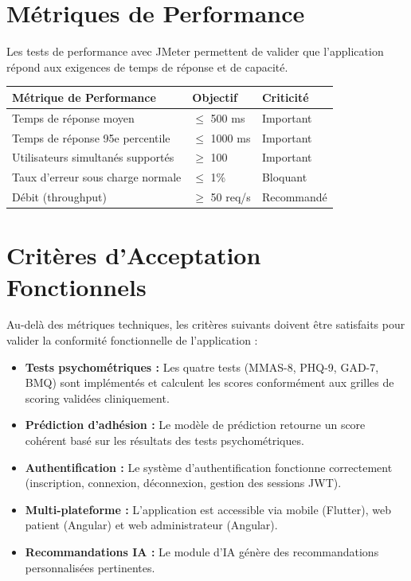 \documentclass[12pt,a4paper]{report}
\begin{document}
\section{Métriques de Performance}

Les tests de performance avec JMeter permettent de valider que l'application répond aux exigences de temps de réponse et de capacité.

\begin{center}
\begin{tabular}{|l|l|l|}
    \hline
    \textbf{Métrique de Performance} & \textbf{Objectif} & \textbf{Criticité} \\
    \hline
    Temps de réponse moyen & $\leq$ 500 ms & Important \\
    \hline
    Temps de réponse 95e percentile & $\leq$ 1000 ms & Important \\
    \hline
    Utilisateurs simultanés supportés & $\geq$ 100 & Important \\
    \hline
    Taux d'erreur sous charge normale & $\leq$ 1\% & Bloquant \\
    \hline
    Débit (throughput) & $\geq$ 50 req/s & Recommandé \\
    \hline
\end{tabular}
\end{center}

\section{Critères d'Acceptation Fonctionnels}

Au-delà des métriques techniques, les critères suivants doivent être satisfaits pour valider la conformité fonctionnelle de l'application :

\begin{itemize}
    \item \textbf{Tests psychométriques :} Les quatre tests (MMAS-8, PHQ-9, GAD-7, BMQ) sont implémentés et calculent les scores conformément aux grilles de scoring validées cliniquement.
    
    \item \textbf{Prédiction d'adhésion :} Le modèle de prédiction retourne un score cohérent basé sur les résultats des tests psychométriques.
    
    \item \textbf{Authentification :} Le système d'authentification fonctionne correctement (inscription, connexion, déconnexion, gestion des sessions JWT).
    
    \item \textbf{Multi-plateforme :} L'application est accessible via mobile (Flutter), web patient (Angular) et web administrateur (Angular).
    
    \item \textbf{Recommandations IA :} Le module d'IA génère des recommandations personnalisées pertinentes.
\end{itemize}
\end{document}

